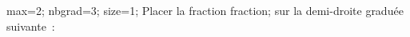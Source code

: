 \documentclass[exercice]{thedocument}%
\begin{document}
%
\!max=2;%
\!nbgrad=3;%
\!size=1;%
Placer la fraction \<fraction; sur la demi-droite graduée
suivante~:\vskip20pt\noindent
{}
\end{document}
